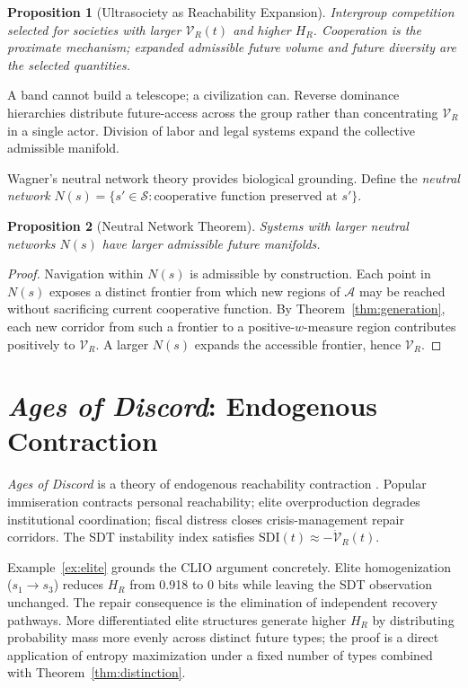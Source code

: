 \documentclass[12pt, a4paper]{article}
\theoremstyle{plain}
\newtheorem{proposition}{Proposition}
\theoremstyle{definition}
\theoremstyle{remark}
\begin{document}
\begin{proposition}[Ultrasociety as Reachability Expansion]
Intergroup competition selected for societies with larger $\mathcal{V}_R(t)$ and higher $H_R$. Cooperation is the proximate mechanism; expanded admissible future volume and future diversity are the selected quantities.
\end{proposition}

A band cannot build a telescope; a civilization can. Reverse dominance hierarchies distribute future-access across the group rather than concentrating $\mathcal{V}_R$ in a single actor. Division of labor and legal systems expand the collective admissible manifold.

Wagner's neutral network theory \cite{wagner2014} provides biological grounding. Define the \emph{neutral network} $N(s) = \{s' \in \mathcal{S} : \text{cooperative function preserved at } s'\}$.

\begin{proposition}[Neutral Network Theorem]
Systems with larger neutral networks $N(s)$ have larger admissible future manifolds.
\end{proposition}

\begin{proof}
Navigation within $N(s)$ is admissible by construction. Each point in $N(s)$ exposes a distinct frontier from which new regions of $\mathcal{A}$ may be reached without sacrificing current cooperative function. By Theorem~\ref{thm:generation}, each new corridor from such a frontier to a positive-$w$-measure region contributes positively to $\mathcal{V}_R$. A larger $N(s)$ expands the accessible frontier, hence $\mathcal{V}_R$.
\end{proof}

\section{\textit{Ages of Discord}: Endogenous Contraction}

\textit{Ages of Discord} is a theory of endogenous reachability contraction \cite{turchin2023}. Popular immiseration contracts personal reachability; elite overproduction degrades institutional coordination; fiscal distress closes crisis-management repair corridors. The SDT instability index satisfies $\mathrm{SDI}(t) \approx -\dot{\mathcal{V}}_R(t)$.

Example~\ref{ex:elite} grounds the CLIO argument concretely. Elite homogenization ($s_1 \to s_3$) reduces $H_R$ from 0.918 to 0 bits while leaving the SDT observation unchanged. The repair consequence is the elimination of independent recovery pathways. More differentiated elite structures generate higher $H_R$ by distributing probability mass more evenly across distinct future types; the proof is a direct application of entropy maximization under a fixed number of types combined with Theorem~\ref{thm:distinction}.
\end{document}
